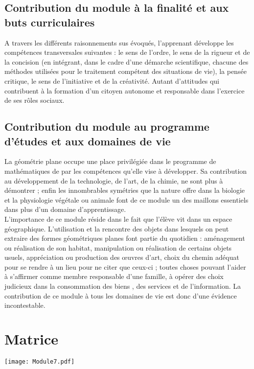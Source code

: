 \subsection{Contribution du module à la finalité et aux buts curriculaires}
A travers les différents raisonnements sus évoqués, l'apprenant développe les compétences transversales suivantes : le sens de l'ordre, le sens de la rigueur et de la concision (en intégrant, dans le cadre d'une démarche scientifique, chacune des méthodes utilisées pour le traitement compétent des situations de vie), la pensée
critique, le sens de l'initiative et de la créativité. Autant d'attitudes qui contribuent à la formation d'un citoyen autonome et responsable dans l'exercice de ses rôles sociaux.

\subsection{Contribution du module au programme d'études et aux domaines de vie}
La géométrie plane occupe une place privilégiée dans le programme de mathématiques de par les compétences qu'elle vise à développer. Sa contribution au développement de la technologie, de l'art, de la chimie, ne sont plus à démontrer ; enfin les innombrables symétries que la nature offre dans la biologie et la physiologie végétale ou animale font de ce module un des maillons essentiels dans plus d'un domaine d'apprentissage.\\
L'importance de ce module réside dans le fait que l'élève vit dans un espace géographique. L'utilisation et la rencontre des objets dans lesquels on peut extraire des formes géométriques planes font partie du quotidien : aménagement ou réalisation de son habitat, manipulation ou réalisation de certains objets usuels, appréciation ou production des œuvres d'art, choix du chemin adéquat pour se rendre à un lieu pour ne citer que ceux-ci ; toutes choses pouvant l'aider à s'affirmer comme membre responsable d'une famille, à opérer des choix judicieux dans la consommation des biens , des services et de l'information. La contribution de ce module à tous les domaines de vie est donc d'une évidence incontestable.

\section{Matrice}

\texttt{[image: Module7.pdf]} 

\subsection*{}

